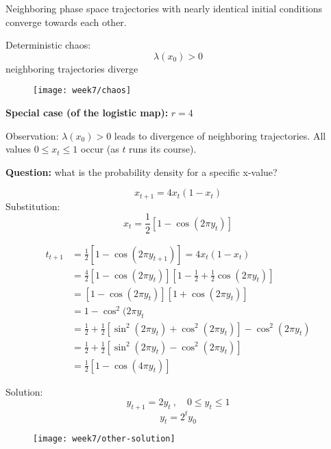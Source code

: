 Neighboring phase space trajectories with nearly identical initial conditions converge towards each other.

Deterministic chaos:
\begin{equation}
\lambda(x_0)>0
\end{equation}
neighboring trajectories diverge
\begin{figure}[h]
    \centering
    \texttt{[image: week7/chaos]}\\
    \caption{}
    \label{fig:chaos}
\end{figure}

\textbf{Special case (of the logistic map):} $r=4$

Observation: $\lambda(x_0)>0$ leads to divergence of neighboring trajectories. All values $0\leq x_t\leq 1$ occur (as $t$ runs its course).

\textbf{Question:} what is the probability density for a specific x-value?

\begin{equation}
x_{t+1} = 4x_t(1-x_t)
\end{equation}
Substitution:
\begin{equation}
x_t=\frac{1}{2}[1-\cos(2\pi y_t)]
\end{equation}

\begin{align}
t_{t+1} &= \frac{1}{2}[1-\cos(2\pi y_{t+1})] = 4x_t(1-x_t) \\
&= \frac{4}{2}[1-\cos(2\pi y_{t})]\left[1-\frac{1}{2}+\frac{1}{2}\cos(2\pi y_t)\right]\\
&= [1-\cos(2\pi y_{t})][1+\cos(2\pi y_{t})]\\
&= 1-\cos^2(2\pi y_t \\
&=\frac{1}{2}+\frac{1}{2}[\sin^2(2\pi y_t)+\cos^2(2\pi y_t)]-\cos^2(2\pi y_t)\\
&= \frac{1}{2}+\frac{1}{2}[\sin^2(2\pi y_t)-\cos^2(2\pi y_t)]\\
&= \frac{1}{2}[1-\cos(4\pi y_t)]
\end{align}

Solution:
\begin{equation}
y_{t+1} = 2y_t\ ,\quad 0\leq y_t \leq 1
\end{equation}
\begin{equation}
y_t = 2^ty_0
\end{equation}

\begin{figure}[h]
    \centering
    \texttt{[image: week7/other-solution]}\\
    \caption{}
    \label{fig:other-solution}
\end{figure}

